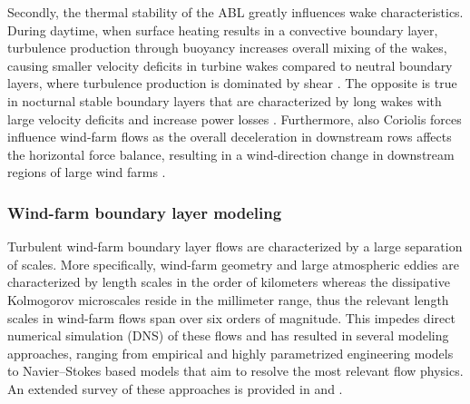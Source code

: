 Secondly, the thermal stability of the ABL greatly influences wake characteristics. During daytime, when surface heating results in a convective boundary layer, turbulence production through buoyancy increases overall mixing of the wakes, causing smaller velocity deficits in turbine wakes compared to neutral boundary layers, where turbulence production is dominated by shear \citep{zhang2013wind,abkar2015influence}. The opposite is true in nocturnal stable boundary layers that are characterized by long wakes with large velocity deficits and increase power losses \citep{barthelmie2010evaluation,dorenkamper}. Furthermore, also Coriolis forces influence wind-farm flows as the overall deceleration in downstream rows affects the horizontal force balance, resulting in a wind-direction change in downstream regions of large wind farms \citep{dorenkamper, allaerts2017boundary, van2017coriolis}.


\subsubsection{Wind-farm boundary layer modeling}
Turbulent wind-farm boundary layer flows are characterized by a large separation of scales. More specifically, wind-farm geometry and large atmospheric eddies are characterized by length scales in the order of kilometers whereas the dissipative Kolmogorov microscales reside in the millimeter range, thus the relevant length scales in wind-farm flows span over six orders of magnitude. This impedes direct numerical simulation (DNS) of these flows and has resulted in several modeling approaches, ranging from empirical and highly parametrized engineering models to Navier--Stokes based models that aim to resolve the most relevant flow physics. An extended survey of these approaches is provided in \cite{crespo1999survey} and \cite{sanderse2011review}. 


